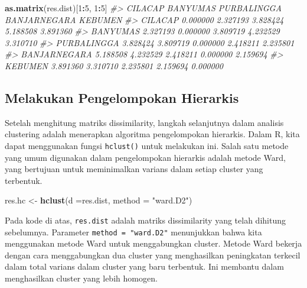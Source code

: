 \documentclass[
  oneside]{book}
\newenvironment{Shaded}{\begin{snugshade}}{\end{snugshade}}
\newcommand{\AttributeTok}[1]{\textcolor[rgb]{0.13,0.29,0.53}{#1}}
\newcommand{\CommentTok}[1]{\textcolor[rgb]{0.56,0.35,0.01}{\textit{#1}}}
\newcommand{\DecValTok}[1]{\textcolor[rgb]{0.00,0.00,0.81}{#1}}
\newcommand{\FunctionTok}[1]{\textcolor[rgb]{0.13,0.29,0.53}{\textbf{#1}}}
\newcommand{\NormalTok}[1]{#1}
\newcommand{\OtherTok}[1]{\textcolor[rgb]{0.56,0.35,0.01}{#1}}
\newcommand{\SpecialCharTok}[1]{\textcolor[rgb]{0.81,0.36,0.00}{\textbf{#1}}}
\newcommand{\StringTok}[1]{\textcolor[rgb]{0.31,0.60,0.02}{#1}}
\begin{document}
\begin{Shaded}
\begin{Highlighting}[]
\FunctionTok{as.matrix}\NormalTok{(res.dist)[}\DecValTok{1}\SpecialCharTok{:}\DecValTok{5}\NormalTok{, }\DecValTok{1}\SpecialCharTok{:}\DecValTok{5}\NormalTok{]}
\CommentTok{\#\textgreater{}               CILACAP BANYUMAS PURBALINGGA BANJARNEGARA  KEBUMEN}
\CommentTok{\#\textgreater{} CILACAP      0.000000 2.327193    3.828424     5.188508 3.891360}
\CommentTok{\#\textgreater{} BANYUMAS     2.327193 0.000000    3.809719     4.232529 3.310710}
\CommentTok{\#\textgreater{} PURBALINGGA  3.828424 3.809719    0.000000     2.418211 2.235801}
\CommentTok{\#\textgreater{} BANJARNEGARA 5.188508 4.232529    2.418211     0.000000 2.159694}
\CommentTok{\#\textgreater{} KEBUMEN      3.891360 3.310710    2.235801     2.159694 0.000000}
\end{Highlighting}
\end{Shaded}

\subsection*{Melakukan Pengelompokan Hierarkis}\label{melakukan-pengelompokan-hierarkis}

Setelah menghitung matriks dissimilarity, langkah selanjutnya dalam analisis clustering adalah menerapkan algoritma pengelompokan hierarkis. Dalam R, kita dapat menggunakan fungsi \texttt{hclust()} untuk melakukan ini. Salah satu metode yang umum digunakan dalam pengelompokan hierarkis adalah metode Ward, yang bertujuan untuk meminimalkan varians dalam setiap cluster yang terbentuk.

\begin{Shaded}
\begin{Highlighting}[]
\NormalTok{res.hc }\OtherTok{\textless{}{-}} \FunctionTok{hclust}\NormalTok{(}\AttributeTok{d =}\NormalTok{res.dist, }\AttributeTok{method =} \StringTok{"ward.D2"}\NormalTok{)}
\end{Highlighting}
\end{Shaded}

Pada kode di atas, \texttt{res.dist} adalah matriks dissimilarity yang telah dihitung sebelumnya. Parameter \texttt{method\ =\ "ward.D2"} menunjukkan bahwa kita menggunakan metode Ward untuk menggabungkan cluster. Metode Ward bekerja dengan cara menggabungkan dua cluster yang menghasilkan peningkatan terkecil dalam total varians dalam cluster yang baru terbentuk. Ini membantu dalam menghasilkan cluster yang lebih homogen.
\end{document}
